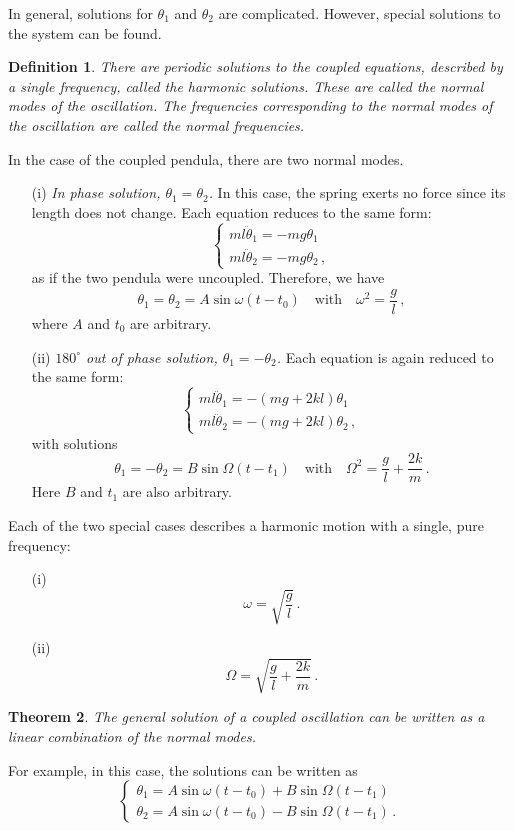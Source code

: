 \documentclass{article}
\theoremstyle{plain}\theoremheaderfont{\normalfont\itshape}\theorembodyfont{\rmfamily}\theoremseparator{.}\newtheorem*{rem}{Remark}\newtheorem*{ex}{Example}\newtheorem*{proof}{Proof}\newtheorem*{altp}{Alternative proof}
\theoremstyle{plain}\theoremheaderfont{\normalfont\bfseries}\theorembodyfont{\rmfamily}\theoremseparator{.}\newtheorem{thm}{Theorem}[section]\newtheorem{lem}[thm]{Lemma}\newtheorem{prop}[thm]{Proposition}\newtheorem*{cor}{Corollary}\newtheorem{defn}[thm]{Definition}\newtheorem{clm}[thm]{Claim}\newtheorem{clminproof}{Claim}
\theoremstyle{break}\theoremheaderfont{\normalfont\itshape}\theorembodyfont{\rmfamily}\theoremseparator{.\medskip}\newtheorem*{proofskip}{Proof}\newtheorem*{exs}{Examples}\newtheorem*{rems}{Remarks}
\theoremstyle{break}\theoremheaderfont{\normalfont\bfseries}\theorembodyfont{\rmfamily}\theoremseparator{.\medskip}\newtheorem{lemskip}[thm]{Lemma}\newtheorem{defnskip}[thm]{Definition}\newtheorem{propskip}[thm]{Proposition}\newtheorem{thmskip}[thm]{Theorem}
\numberwithin{equation}{section}
\begin{document}
	In general, solutions for \(\theta_1\) and \(\theta_2\) are complicated. However, special solutions to the system can be found.
	\begin{defn}
		There are periodic solutions to the coupled equations, described by a single frequency, called the \textit{harmonic solutions}. These are called the \textit{normal modes} of the oscillation. The frequencies corresponding to the normal modes of the oscillation are called the \textit{normal frequencies}.
	\end{defn}

	In the case of the coupled pendula, there are two normal modes.
	\begin{enumerate}[topsep=0pt]
		\item[(i)] \textit{In phase solution, \(\theta_1=\theta_2\).} In this case, the spring exerts no force since its length does not change. Each equation reduces to the same form:
		\[\begin{cases}
			ml\ddot{\theta}_1=-mg\theta_1\\
			ml\ddot{\theta}_2=-mg\theta_2\,,
		\end{cases}\]
		as if the two pendula were uncoupled. Therefore, we have
		\[\theta_1=\theta_2=A\sin\omega(t-t_0)\quad\text{with}\quad\omega^2=\frac{g}{l}\,,\]
		where \(A\) and \(t_0\) are arbitrary.
		\item[(ii)] \textit{\(180^\circ\) out of phase solution, \(\theta_1=-\theta_2\).} Each equation is again reduced to the same form:
		\[\begin{cases}
			ml\ddot{\theta}_1=-(mg+2kl)\theta_1\\
			ml\ddot{\theta}_2=-(mg+2kl)\theta_2\,,
		\end{cases}\]
		with solutions
		\[\theta_1=-\theta_2=B\sin\Omega(t-t_1)\quad\text{with}\quad\Omega^2=\frac{g}{l}+\frac{2k}{m}\,.\]
		Here \(B\) and \(t_1\) are also arbitrary.
	\end{enumerate}

	Each of the two special cases describes a harmonic motion with a single, pure frequency:
	\begin{enumerate}[topsep=0pt]
		\item[(i)] \[\omega=\sqrt{\frac{g}{l}}\,.\]
		\item[(ii)] \[\Omega=\sqrt{\frac{g}{l}+\frac{2k}{m}}\,.\]
	\end{enumerate}

	\begin{thm}
		The general solution of a coupled oscillation can be written as a linear combination of the normal modes.
	\end{thm}
	For example, in this case, the solutions can be written as
	\[\begin{cases}
		\theta_1=A\sin\omega(t-t_0)+B\sin\Omega(t-t_1)\\
		\theta_2=A\sin\omega(t-t_0)-B\sin\Omega(t-t_1)\,.
	\end{cases}\]
\end{document}
